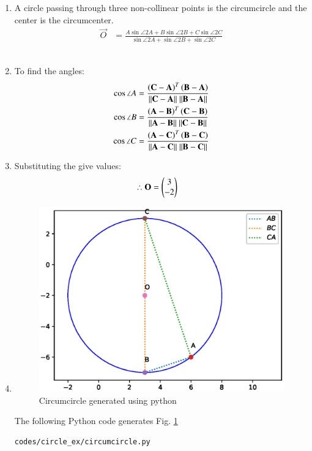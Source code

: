 \renewcommand{\theequation}{\theenumi}
\begin{enumerate}[label=\thesubsection.\arabic*.,ref=\thesubsection.\theenumi]

\item \solution A circle passing through three non-collinear points is the circumcircle and the center is the circumcenter.\\
\begin{align}
\vec{O} &= \frac{A\sin{\angle 2A} + B\sin{\angle 2B} + C\sin{\angle 2C}}{\sin{\angle 2A} + \sin{\angle 2B} + \sin{\angle 2C}}\nonumber
\end{align}\\

\item To find the angles:
\begin{align}
\cos{\angle A} &= \frac{ \left(\mathbf{C}-\mathbf{A}\right)^T \left(\mathbf{B}-\mathbf{A}\right)}{\| \mathbf{C}-\mathbf{A} \|\ \| \mathbf{B}-\mathbf{A} \|} \\
\cos{\angle B} &= \frac{ \left(\mathbf{A}-\mathbf{B}\right)^T \left(\mathbf{C}-\mathbf{B}\right)}{\| \mathbf{A}-\mathbf{B} \|\ \| \mathbf{C}-\mathbf{B} \|} \\
\cos{\angle C} &= \frac{ \left(\mathbf{A}-\mathbf{C}\right)^T \left(\mathbf{B}-\mathbf{C}\right)}{\| \mathbf{A}-\mathbf{C} \|\ \| \mathbf{B}-\mathbf{C} \|} 
\end{align}

\item Substituting the give values:
\begin{align}
\therefore \mathbf{O} &= \begin{pmatrix}3\\-2\end{pmatrix}
\end{align}


\item \begin{figure}[!ht]
\centering
\includegraphics[width=\columnwidth]{./figs/circle_ex/circumcircle.eps}
\caption{Circumcircle generated using python}
\label{fig:Circumcircle2_circle_ex}
\end{figure} 

The following Python code generates Fig. \ref{fig:Circumcircle2_circle_ex}

\begin{lstlisting}
codes/circle_ex/circumcircle.py
\end{lstlisting}
\end{enumerate}



